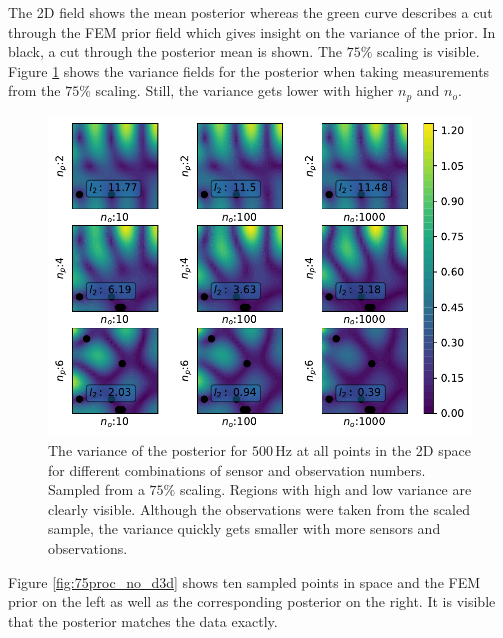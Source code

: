 \documentclass[%
  a4paper,oneside,%
  11pt,%
  smallchapters,
  style=printdev,
  extramargin,
  green,%
  rgb, <cmyk>
  ]{tubsbook}
\begin{document}
The 2D field shows the mean posterior whereas the green curve describes a cut through the FEM prior field which gives insight on the variance of the prior. In black, a cut through the posterior mean is shown. The $75\%$ scaling is visible.
%
Figure \ref{fig:75proc_no_d} shows the variance fields for the posterior when taking measurements from the $75\%$ scaling. Still, the variance gets lower with higher $n_p$ and $n_o$.
%
\begin{figure}[!ht]
\includegraphics[width=.9\textwidth]{../../Python/Results/2D/75procent_no_d/VarField_Posterior.pdf}
\centering
\caption[Posterior of the 2D Helmholtz equation example for different numbers of sensors and observations for a 0.75x scaled prior as ground truth]{The variance of the posterior for $500\, \mathrm{Hz}$ at all points in the 2D space for different combinations of sensor and observation numbers. Sampled from a $75\%$ scaling. Regions with high and low variance are clearly visible. Although the observations were taken from the scaled sample, the variance quickly gets smaller with more sensors and observations.}
\label{fig:75proc_no_d}
\end{figure}
%
Figure \ref{fig:75proc_no_d3d} shows ten sampled points in space and the FEM prior on the left as well as the corresponding posterior on the right. It is visible that the posterior matches the data exactly.
%
\end{document}
